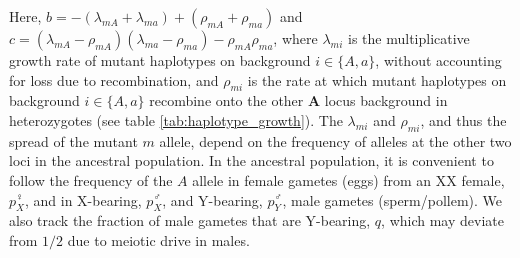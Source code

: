 \documentclass[12pt]{article}
\begin{document}
Here, $b= - (\lambda_{mA} + \lambda_{ma})+(\rho_{mA} + \rho_{ma})$ and $c = (\lambda_{mA}-\rho_{mA}) (\lambda_{ma}-\rho_{ma}) -\rho_{mA} \rho_{ma}$, where $\lambda_{mi}$ is the multiplicative growth rate of mutant haplotypes on background $i\in\{A,a\}$, without accounting for loss due to recombination, and $\rho_{mi}$ is the rate at which mutant haplotypes on background $i\in\{A,a\}$ recombine onto the other \textbf{A} locus background in heterozygotes (see table \ref{tab:haplotype_growth}).
The $\lambda_{mi}$ and $\rho_{mi}$, and thus the spread of the mutant $m$ allele, depend on the frequency of alleles at the other two loci in the ancestral population. 
In the ancestral population, it is convenient to follow the frequency of the $A$ allele in female gametes (eggs) from an XX female, $p^\female_X$, and in X-bearing, $p^\male_X$, and Y-bearing, $p^\male_Y$, male gametes (sperm/pollem).
We also track the fraction of male gametes that are Y-bearing, $q$, which may deviate from $1/2$ due to meiotic drive in males. 

%

\end{document}
